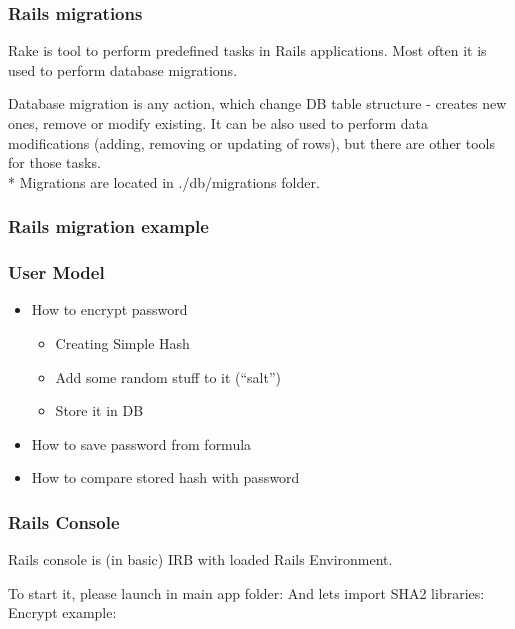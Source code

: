 \documentclass{beamer}
\theoremstyle{mystyle}
\begin{document}
    \begin{frame}
      \frametitle{Rails migrations}
      \begin{definition}[Rake]
        Rake is tool to perform predefined tasks in Rails applications. Most
        often it is used to perform database migrations.
      \end{definition}
      
      \begin{definition}[Migrations]
        Database migration is any action, which change DB table structure -
        creates new ones, remove or modify existing. It can be also used to
        perform data modifications (adding, removing or updating of rows), but
        there are other tools for those tasks.\\*
        Migrations are located in ./db/migrations folder.
      \end{definition}
      
      \databasemigrationuser
    \end{frame}
    
    \begin{frame}
      \frametitle{Rails migration example}
      \begin{example}
        \migrationuser
      \end{example}
    \end{frame}
    
    \begin{frame}
      \frametitle{User Model}
      \begin{itemize}
      \item How to encrypt password 
        \begin{itemize}
        \item Creating Simple Hash
        \item Add some random stuff to it (``salt'')
        \item Store it in DB
        \end{itemize}
      \item How to save password from formula
      \item How to compare stored hash with password 
      \end{itemize}
    \end{frame}
    
    \begin{frame}
      \frametitle{Rails Console}
      \begin{definition}
        Rails console is (in basic) IRB with loaded Rails Environment.
      \end{definition}
      To start it, please launch in main app folder:
      \railsconsolestart
      And lets import SHA2 libraries:
      \railsimportsha
      Encrypt example:
      \railsconsoleencrypt
    \end{frame}
    
\end{document}
